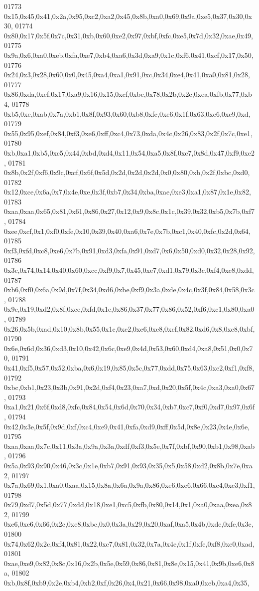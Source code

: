 \begin{DoxyCode}
01773   0x15,0x45,0x41,0x2a,0x95,0xc2,0xa2,0x45,0x8b,0xa0,0x69,0x9a,0xe5,0x37,0x30,0x30,
01774   0x80,0x17,0x5f,0x7c,0x31,0xb,0x60,0xe2,0x97,0xbf,0xfc,0xe5,0x7d,0x32,0xae,0x49,
01775   0x9a,0x6,0xa0,0xeb,0xfa,0xe7,0xb4,0xa6,0x3d,0xa9,0x1c,0xf6,0x41,0xcf,0x17,0x50,
01776   0x24,0x3,0x28,0x60,0x0,0x45,0xa4,0xa1,0x91,0xc,0x34,0xe4,0x41,0xa0,0x81,0x28,
01777   0x86,0xda,0xef,0x17,0xa9,0x16,0x15,0xcf,0xbc,0x78,0x2b,0x2e,0xea,0xfb,0x77,0xb4,
01778   0xb5,0xe,0xab,0x7a,0xb1,0x8f,0x93,0x60,0xb8,0xfe,0xe6,0x1f,0x63,0xe6,0xc9,0xd,
01779   0x55,0x95,0xef,0x84,0xf3,0xe6,0xff,0xc4,0x73,0xda,0x4c,0x26,0x83,0x2f,0x7c,0xe1,
01780   0xb,0xa1,0xb5,0xc5,0x44,0xbd,0xd4,0x11,0x54,0xa5,0x8f,0xc7,0x8d,0x47,0xf9,0xe2,
01781   0x8b,0x2f,0xf6,0x9c,0xcf,0x6f,0x5d,0x2d,0x2d,0x2d,0x0,0x80,0xb,0x2f,0xbc,0xd0,
01782   0x12,0xce,0x6a,0x7,0x4e,0xe,0x3f,0xb7,0x34,0xba,0xae,0xe3,0xa1,0x87,0x1e,0x82,
01783   0xaa,0xaa,0x65,0x81,0x61,0x86,0x27,0x12,0x9,0x8c,0x1c,0x39,0x32,0xb5,0x7b,0xf7,
01784   0xee,0xcf,0x1,0xf0,0xfe,0x10,0x39,0x40,0xa6,0x7e,0x7b,0xc1,0x40,0xfc,0x2d,0x64,
01785   0xf3,0xfd,0xc8,0xe6,0x7b,0x91,0xd3,0xfa,0x91,0xd7,0x6,0x50,0xd0,0x32,0x28,0x92,
01786   0x3c,0x74,0x14,0x40,0x60,0xcc,0xf9,0x7,0x45,0xe7,0xd1,0x79,0x3c,0xf4,0xc8,0xdd,
01787   0xb6,0xf0,0x6a,0x9d,0x7f,0x34,0xd6,0xbe,0xf9,0x3a,0xde,0x4c,0x3f,0x84,0x58,0x3c,
01788   0x9c,0x19,0xd2,0x8f,0xce,0xfd,0x1e,0x86,0x37,0x77,0x86,0x52,0xf6,0xc1,0x80,0xa0,
01789   0x26,0x5b,0xad,0x10,0x8b,0x55,0x1c,0xc2,0xe6,0xe8,0xcf,0x82,0xd6,0x8,0xe8,0xbf,
01790   0x6e,0x6d,0x36,0xd3,0x10,0x42,0x6c,0xe9,0x4d,0x53,0x60,0xd4,0xa8,0x51,0x0,0x70,
01791   0x41,0xf5,0x57,0x52,0xba,0x6,0x19,0x85,0x5c,0x77,0xdd,0x75,0x63,0xe2,0xf1,0xf8,
01792   0xbc,0xb1,0x23,0x3b,0x91,0x2d,0xf4,0x23,0xa7,0xd,0x20,0x5f,0x4c,0xa3,0xa0,0x67,
01793   0xa1,0x21,0x6f,0xd8,0xfc,0x84,0x54,0x6d,0x70,0x34,0xb7,0xc7,0xf0,0xd7,0x97,0x6f,
01794   0x42,0x3e,0x5f,0x9d,0xf,0xc4,0xe9,0x41,0xfa,0xd9,0xff,0x5d,0x8e,0x23,0x4e,0x6e,
01795   0xaa,0xaa,0x7c,0x11,0x3a,0x9a,0x3a,0xdf,0xf3,0x5e,0x7f,0xbf,0x90,0xb1,0x98,0xab,
01796   0x5a,0x93,0x90,0x46,0x3c,0x1e,0xb7,0x91,0x93,0x35,0x5,0x58,0xd2,0x8b,0x7e,0xa2,
01797   0x7a,0x69,0x1,0xa0,0xaa,0x15,0x8a,0x6a,0x9a,0x86,0xe6,0xe6,0x66,0xc4,0xe3,0xf1,
01798   0x79,0xd7,0x5d,0x77,0xdd,0x18,0xe1,0xc5,0xfb,0x80,0x14,0x1,0xa0,0xaa,0xea,0x82,
01799   0xe6,0xe6,0x66,0x2c,0xe8,0xbc,0x0,0x3a,0x29,0x20,0xaf,0xa5,0x4b,0xde,0xfe,0x3c,
01800   0x74,0x62,0x2c,0xf4,0x81,0x22,0xc7,0x81,0x32,0x7a,0x4e,0x1f,0xfe,0xf8,0xe0,0xad,
01801   0xae,0xe9,0x82,0x8c,0x16,0x2b,0x5e,0x59,0x86,0x81,0x8e,0x15,0x41,0x9b,0xe6,0x8a,
01802   0xb,0x8f,0xb9,0x2e,0xb4,0xb2,0xf,0x26,0x4,0x21,0x66,0x98,0xa0,0xeb,0xa4,0x35,

\end{DoxyCode}

